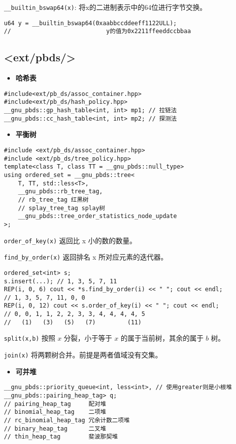 \documentclass[a4paper,landscape,twocolumn]{ctexart}
\newcommand{\point}[1]{
	\begin{itemize}
		\item \textbf{#1}
	\end{itemize}
}
\begin{document}
\texttt{\_\_builtin\_bswap64(x)}: 将x的二进制表示中的64位进行字节交换。
\begin{lstlisting}
u64 y = __builtin_bswap64(0xaabbccddeeff1122ULL);
//                           y的值为0x2211ffeeddccbbaa
\end{lstlisting}

\subsection{<ext/pbds/>}

\point{哈希表}

\begin{lstlisting}
#include<ext/pb_ds/assoc_container.hpp>
#include<ext/pb_ds/hash_policy.hpp>
__gnu_pbds::gp_hash_table<int, int> mp1; // 拉链法
__gnu_pbds::cc_hash_table<int, int> mp2; // 探测法
\end{lstlisting}

\point{平衡树}

\begin{lstlisting}
#include <ext/pb_ds/assoc_container.hpp>
#include <ext/pb_ds/tree_policy.hpp>
template<class T, class TT = __gnu_pbds::null_type>
using ordered_set = __gnu_pbds::tree<
	T, TT, std::less<T>,
	__gnu_pbds::rb_tree_tag,
	// rb_tree_tag 红黑树
	// splay_tree_tag splay树
	__gnu_pbds::tree_order_statistics_node_update
>;
\end{lstlisting}

\texttt{order\_of\_key(x)}  返回比 x 小的数的数量。

\texttt{find\_by\_order(x)}  返回排名 x 所对应元素的迭代器。

\begin{lstlisting}
ordered_set<int> s;
s.insert(...); // 1, 3, 5, 7, 11
REP(i, 0, 6) cout << *s.find_by_order(i) << " "; cout << endl;
// 1, 3, 5, 7, 11, 0, 0
REP(i, 0, 12) cout << s.order_of_key(i) << " "; cout << endl;
// 0, 0, 1, 1, 2, 2, 3, 3, 4, 4, 4, 4, 5
//   (1)   (3)   (5)   (7)         (11)
\end{lstlisting}

\texttt{split(x,b)} 按照 $x$ 分裂，小于等于 $x$ 的属于当前树，其余的属于 $b$ 树。

\texttt{join(x)} 将两颗树合并。前提是两者值域没有交集。

\point{可并堆}

\begin{lstlisting}
__gnu_pbds::priority_queue<int, less<int>, // 使用greater则是小根堆
__gnu_pbds::pairing_heap_tag> q;
// pairing_heap_tag     配对堆
// binomial_heap_tag    二项堆
// rc_binomial_heap_tag 冗余计数二项堆
// binary_heap_tag      二叉堆
// thin_heap_tag        斐波那契堆
\end{lstlisting}
\end{document}
